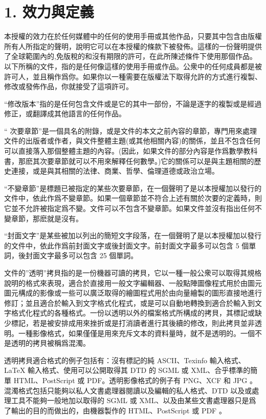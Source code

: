 \section{1. 效力與定義}
本授權的效力在於任何媒體中的任何的使用手冊或其他作品，只要其中包含由版權所有人所指定的聲明，說明它可以在本授權的條款下被發佈。這樣的一份聲明提供了全球範圍內的,免版稅的和沒有期限的許可，在此所陳述條件下使用那個作品。以下所稱的文件，指的是任何像這樣的使用手冊或作品。公衆中的任何成員都是被許可人，並且稱作爲你。如果你以一種需要在版權法下取得允許的方式進行複製、修改或發佈作品，你就接受了這項許可。\par
“修改版本”指的是任何包含文件或是它的其中一部份，不論是逐字的複製或是經過修正，或翻譯成其他語言的任何作品。\par
“ 次要章節”是一個具名的附錄，或是文件的本文之前內容的章節，專門用來處理文件的出版者或作者，與文件整體主題(或其他相關內容)的關係，並且不包含任何可以直接落入那個整體主題的內容。(因此，如果文件的部分內容是作爲數學教科書，那麽其次要章節就可以不用來解釋任何數學。)它的關係可以是與主題相關的歷史連接，或是與其相關的法律、商業、哲學、倫理道德或政治立場。\par
“不變章節”是標題已被指定的某些次要章節，在一個聲明了是以本授權加以發行的文件中，依此作爲不變章節。如果一個章節並不符合上述有關於次要的定義時，則它並不允許被指定爲不變。文件可以不包含不變章節。如果文件並沒有指出任何不變章節，那麽就是沒有。\par
“封面文字”是某些被加以列出的簡短文字段落，在一個聲明了是以本授權加以發行的文件中，依此作爲前封面文字或後封面文字。前封面文字最多可以包含 5 個單詞，後封面文字最多可以包含 25 個單詞。\par
文件的”透明”拷貝指的是一份機器可讀的拷貝，它以一種一般公衆可以取得其規格說明的格式來表現，適合於直接用一般文字編輯器、一般點陣圖像程式用於由圖元圖元構成的影像或一些可以廣泛取得的繪圖程式用於由向量繪製的圖形直接地進行修訂；並且適合於輸入到文字格式化程式，或是可以自動地轉換到適合於輸入到文字格式化程式的各種格式。一份以透明以外的檔案格式所構成的拷貝，其標記或缺少標記，若是被安排成用來挫折或是打消讀者進行其後續的修改，則此拷貝並非透明。一種影像格式，如果僅僅是用來充斥文本的資料量時，就不是透明的。一個不是透明的拷貝被稱爲混濁。\par
透明拷貝適合格式的例子包括有：沒有標記的純 ASCII、Texinfo 輸入格式、LaTeX 輸入格式、使用可以公開取得其 DTD 的 SGML 或 XML、合乎標準的簡單 HTML、PostScript 或 PDF。透明影像格式的例子有 PNG、XCF 和 JPG 。混濁格式包括只能夠以私人文書處理器閱讀以及編輯的私人格式、DTD 以及或處理工具不能夠一般地加以取得的 SGML 或 XML、以及由某些文書處理器只是爲了輸出的目的而做出的，由機器製作的 HTML、PostScript 或 PDF 。\par
